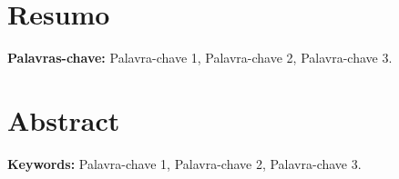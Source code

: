 \thispagestyle{empty}
\section*{Resumo}
\lipsum[1]

\noindent\textbf{Palavras-chave:} Palavra-chave 1, Palavra-chave 2, Palavra-chave 3.

\section*{Abstract}
\lipsum[1]

\noindent\textbf{Keywords:} Palavra-chave 1, Palavra-chave 2, Palavra-chave 3.